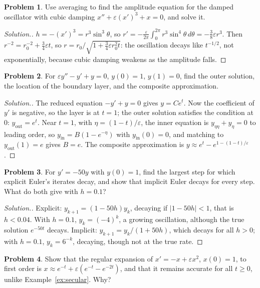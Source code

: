 \documentclass[11pt,a4paper]{article}
\numberwithin{equation}{section}
\theoremstyle{definition}
\newtheorem{problemx}{Problem}[subsection]
\newenvironment{problem}{\begin{problemx}}{\end{problemx}}
\newenvironment{solution}
  {\renewcommand{\qedsymbol}{}\begin{proof}[\textit{Solution}.]}
  {\end{proof}}
\begin{document}
\begin{problem}
Use averaging to find the amplitude equation for the damped oscillator with cubic damping $x'' + \varepsilon(x')^3 + x = 0$, and solve it.
\end{problem}

\begin{solution}
$h = -(x')^3 = r^3\sin^3\theta$, so $r' = -\frac\varepsilon{2\pi}\int_0^{2\pi}r^3\sin^4\theta\,d\theta = -\frac38\varepsilon r^3$. Then $r^{-2} = r_0^{-2} + \frac34\varepsilon t$, so $r = r_0/\sqrt{1 + \frac34\varepsilon r_0^2t}$: the oscillation decays like $t^{-1/2}$, not exponentially, because cubic damping
weakens as the amplitude falls.
\end{solution}

\begin{problem}
For $\varepsilon y'' - y' + y = 0$, $y(0) = 1$, $y(1) = 0$, find the outer solution, the location of the boundary layer, and the composite approximation.
\end{problem}

\begin{solution}
The reduced equation $-y' + y = 0$ gives $y = Ce^t$. Now the coefficient of $y'$ is negative, so the layer is at $t = 1$; the outer solution satisfies the condition at $0$: $y_{\text{out}} = e^t$. Near $t = 1$, with
$\eta = (1 - t)/\varepsilon$, the inner equation is $y_{\eta\eta} + y_\eta = 0$ to leading order, so $y_{\text{in}} = B(1 - e^{-\eta})$ with $y_{\text{in}}(0) = 0$, and matching to $y_{\text{out}}(1) = e$ gives $B = e$. The composite approximation is
$y \approx e^t - e^{1 - (1 - t)/\varepsilon}$.
\end{solution}

\begin{problem}
For $y' = -50y$ with $y(0) = 1$, find the largest step for which explicit Euler's iterates decay, and show that implicit Euler decays for every step. What do both give with $h = 0.1$?
\end{problem}

\begin{solution}
Explicit: $y_{k+1} = (1 - 50h)y_k$, decaying if $|1 - 50h| < 1$, that is $h < 0.04$. With $h = 0.1$, $y_k = (-4)^k$, a growing oscillation, although the true solution $e^{-50t}$ decays. Implicit: $y_{k+1} = y_k/(1 + 50h)$, which decays
for all $h > 0$; with $h = 0.1$, $y_k = 6^{-k}$, decaying, though not at the true rate.
\end{solution}

\begin{problem}
Show that the regular expansion of $x' = -x + \varepsilon x^2$, $x(0) = 1$, to first order is $x \approx e^{-t} + \varepsilon(e^{-t} - e^{-2t})$, and that it remains accurate for all $t \geq 0$, unlike Example~\ref{ex:secular}. Why?
\end{problem}
\end{document}
